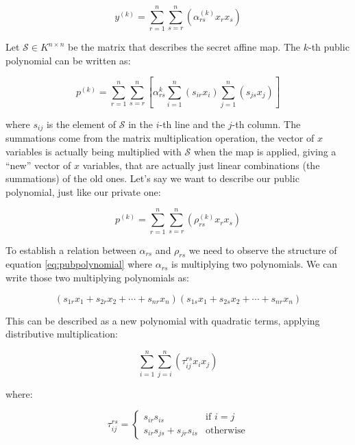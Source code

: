 \documentclass{ufsctex/ufsctex}
\begin{document}
\begin{equation}
y^{(k)} = \sum_{r=1}^n \sum_{s=r}^n\left(\alpha^{(k)}_{rs}x_rx_s\right)
\end{equation}

Let $\mathcal{S} \in K^{n \times n}$ be the matrix that describes the secret
affine map. The $k$-th public polynomial can be written as:

\begin{equation}\label{eq:pubpolynomial}
p^{(k)} = \sum_{r=1}^n \sum_{s=r}^n
\left[ \alpha^{k}_{rs} \sum_{i=1}^n(s_{ir}x_i) \sum_{j=1}^n(s_{js}x_j) \right]
\end{equation}

where $s_{ij}$ is the element of $\mathcal{S}$ in the $i$-th line and the
$j$-th column. The summations come from the matrix multiplication operation,
the vector of $x$ variables is actually being multiplied with $\mathcal{S}$
when the map is applied, giving  a ``new'' vector of $x$ variables, that are
actually just linear combinations (the summations) of the old ones. Let's say
we want to describe our public polynomial, just like our private one:

\begin{equation}
p^{(k)} = \sum_{r=1}^n \sum_{s=r}^n \left( \rho^{(k)}_{rs}x_rx_s \right)
\end{equation}

To establish a relation between $\alpha_{rs}$ and $\rho_{rs}$ we need to
observe the structure of equation \ref{eq:pubpolynomial} where $\alpha_{rs}$ is
multiplying two polynomials. We can write those two multiplying polynomials as:

\begin{equation}
(s_{1r}x_1 + s_{2r}x_2 + \cdots + s_{nr}x_n)
(s_{1s}x_1 + s_{2s}x_2 + \cdots + s_{nr}x_n)
\end{equation}

This can be described as a new polynomial with quadratic terms, applying
distributive multiplication:

\begin{equation}\label{eq:tau}
\sum_{i=1}^{n}\sum_{j=i}^n \left( \tau^{rs}_{ij} x_i x_j \right)
\end{equation}

where:

\begin{equation*}
\tau^{rs}_{ij} =
\begin{cases}
	s_{ir} s_{is} &\mbox{if } i=j \\
	s_{ir} s_{js} + s_{jr} s_{is} &\mbox{otherwise}
\end{cases}
\end{equation*}
\end{document}
